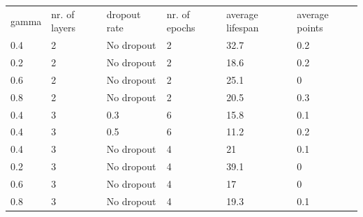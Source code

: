 \documentclass[]{article}
\begin{document}
\begin{table}[H]
	\centering
	\begin{tabular}{llllll}
		gamma & nr. of layers & dropout rate & nr. of epochs & average lifespan & average points \\
		0.4   & 2                & No dropout   & 2                & 32.7             & 0.2                  \\
		0.2   & 2                & No dropout   & 2                & 18.6             & 0.2                  \\
		0.6   & 2                & No dropout   & 2                & 25.1             & 0                    \\
		0.8   & 2                & No dropout   & 2                & 20.5             & 0.3                  \\
		0.4   & 3                & 0.3          & 6                & 15.8             & 0.1                  \\
		0.4   & 3                & 0.5          & 6                & 11.2             & 0.2                  \\
		0.4   & 3                & No dropout   & 4                & 21               & 0.1                  \\
		0.2   & 3                & No dropout   & 4                & 39.1             & 0                    \\
		0.6   & 3                & No dropout   & 4                & 17               & 0                    \\
		0.8   & 3                & No dropout   & 4                & 19.3             & 0.1                 
	\end{tabular}
\end{table}
\end{document}

